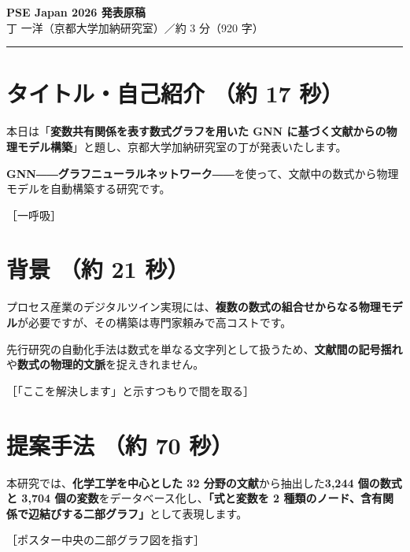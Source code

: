 \documentclass[a5paper,11pt]{ltjsarticle}
\begin{document}
\begin{center}
{\Large\bfseries\color{accent} PSE Japan 2026 発表原稿}\\[0.3em]
\small 丁 一洋（京都大学加納研究室）／約 3 分（920 字）
\end{center}

\hrule\vspace{0.5em}

\section*{タイトル・自己紹介 \normalfont\small（約 17 秒）}

本日は「\textbf{変数共有関係を表す数式グラフを用いた GNN に基づく文献からの物理モデル構築}」と題し、京都大学加納研究室の丁が発表いたします。

\textbf{GNN――グラフニューラルネットワーク――}を使って、文献中の数式から物理モデルを自動構築する研究です。

\begin{memo}\small ［一呼吸］\end{memo}

\section*{背景 \normalfont\small（約 21 秒）}

プロセス産業のデジタルツイン実現には、\textbf{複数の数式の組合せからなる物理モデル}が必要ですが、その構築は専門家頼みで高コストです。

先行研究の自動化手法は数式を単なる文字列として扱うため、\textbf{文献間の記号揺れ}や\textbf{数式の物理的文脈}を捉えきれません。

\begin{memo}\small ［「ここを解決します」と示すつもりで間を取る］\end{memo}

\section*{提案手法 \normalfont\small（約 70 秒）}

本研究では、\textbf{化学工学を中心とした 32 分野の文献}から抽出した\textbf{3,244 個の数式と 3,704 個の変数}をデータベース化し、\textbf{「式と変数を 2 種類のノード、含有関係で辺結びする二部グラフ」}として表現します。

\begin{memo}\small ［ポスター中央の二部グラフ図を指す］\end{memo}
\end{document}

